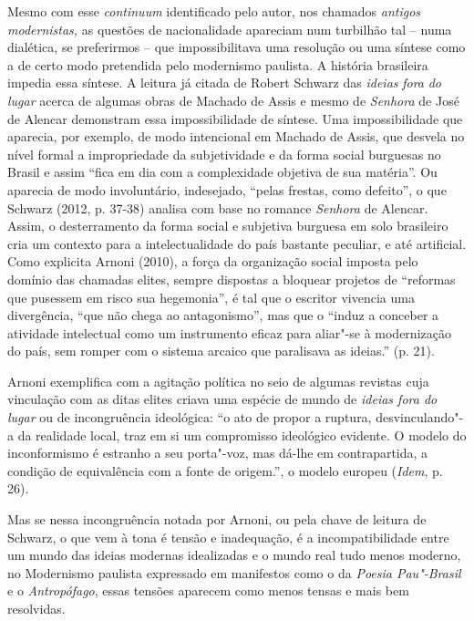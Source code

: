 Mesmo com esse \emph{continuum} identificado pelo autor, nos chamados
\emph{antigos modernistas,} as questões de nacionalidade apareciam num
turbilhão tal -- numa dialética, se preferirmos -- que impossibilitava
uma resolução ou uma síntese como a de certo modo pretendida pelo
modernismo paulista. A história brasileira impedia essa síntese. A
leitura já citada de Robert Schwarz das \emph{ideias} \emph{fora}
\emph{do} \emph{lugar} acerca de algumas obras de Machado de Assis e
mesmo de \emph{Senhora} de José de Alencar demonstram essa
impossibilidade de síntese. Uma impossibilidade que aparecia, por
exemplo, de modo intencional em Machado de Assis, que desvela no nível
formal a impropriedade da subjetividade e da forma social burguesas no
Brasil e assim ``fica em dia com a complexidade objetiva de sua
matéria''. Ou aparecia de modo involuntário, indesejado, ``pelas
frestas, como defeito'', o que Schwarz (2012, p. 37-38) analisa com base
no romance \emph{Senhora} de Alencar. Assim, o desterramento da forma
social e subjetiva burguesa em solo brasileiro cria um contexto para a
intelectualidade do país bastante peculiar, e até artificial. Como
explicita Arnoni (2010), a força da organização social imposta pelo
domínio das chamadas elites, sempre dispostas a bloquear projetos de
``reformas que pusessem em risco sua hegemonia'', é tal que o escritor
vivencia uma divergência, ``que não chega ao antagonismo'', mas que o
``induz a conceber a atividade intelectual como um instrumento eficaz
para aliar"-se à modernização do país, sem romper com o sistema arcaico
que paralisava as ideias.'' (p. 21).

Arnoni exemplifica com a agitação política no seio de algumas revistas
cuja vinculação com as ditas elites criava uma espécie de mundo de
\emph{ideias fora do lugar} ou de incongruência ideológica: ``o ato de
propor a ruptura, desvinculando"-a da realidade local, traz em si um
compromisso ideológico evidente. O modelo do inconformismo é estranho a
seu porta"-voz, mas dá-lhe em contrapartida, a condição de equivalência
com a fonte de origem.'', o modelo europeu (\emph{Idem}, p. 26).

Mas se nessa incongruência notada por Arnoni, ou pela chave de leitura
de Schwarz, o que vem à tona é tensão e inadequação, é a
incompatibilidade entre um mundo das ideias modernas idealizadas e o
mundo real tudo menos moderno, no Modernismo paulista expressado em
manifestos como o da \emph{Poesia Pau"-Brasil} e o \emph{Antropófago},
essas tensões aparecem como menos tensas e mais bem resolvidas.

